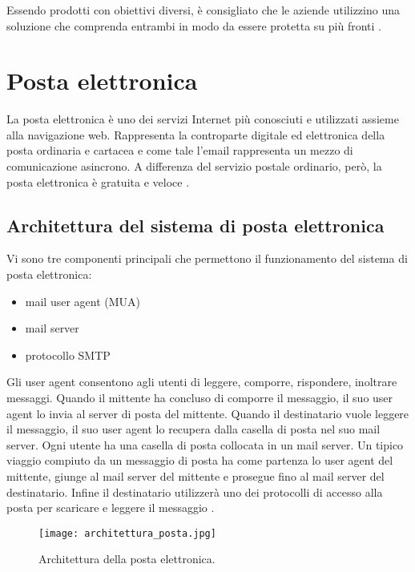     \subsubsection*{}     
    Essendo prodotti con obiettivi diversi, è consigliato che le aziende utilizzino una soluzione che comprenda entrambi
    in modo da essere protetta su più fronti \cite{DLP5}.


\pagebreak
\section{Posta elettronica}
La posta elettronica è uno dei servizi Internet più conosciuti e utilizzati assieme alla navigazione web. 
Rappresenta la controparte digitale ed elettronica della posta ordinaria e cartacea e come tale l’email 
rappresenta un mezzo di comunicazione asincrono. A differenza del servizio postale ordinario, però, 
la posta elettronica è gratuita e veloce \cite{posta}.

\subsection{Architettura del sistema di posta elettronica}
Vi sono tre componenti principali che permettono il funzionamento del sistema di posta elettronica:
\begin{itemize}
    \item mail user agent (MUA)
    \item mail server
    \item protocollo SMTP
\end{itemize}
Gli user agent consentono agli utenti di leggere, comporre, rispondere, inoltrare messaggi. 
Quando il mittente ha concluso di comporre il messaggio, il suo user agent lo invia al server di posta del mittente. 
Quando il destinatario vuole leggere il messaggio, il suo user agent lo recupera dalla casella di posta nel suo mail server. 
Ogni utente ha una casella di posta collocata in un mail server.
Un tipico viaggio compiuto da un messaggio di posta ha come partenza lo user agent del mittente, 
giunge al mail server del mittente e prosegue fino al mail server del destinatario. 
Infine il destinatario utilizzerà uno dei protocolli di accesso alla posta per scaricare e leggere il messaggio \cite{kurose2008reti}.

\begin{figure}[htp]
    \centering
    \texttt{[image: architettura\_posta.jpg]}
        \caption{Architettura della posta elettronica\cite{kurose2008reti}.}\label{architetturaPosta}
  \end{figure}


